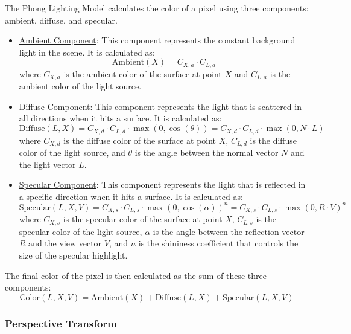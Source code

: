 The Phong Lighting Model calculates the color of a pixel using three components: ambient, diffuse, and specular.
\begin{itemize}
    \item \ul{Ambient Component}: This component represents the constant background light in the scene. It is calculated as:
    \begin{equation*}
        \text{Ambient}(X) = C_{X,a}\cdot C_{L,a}
    \end{equation*}
    where $C_{X,a}$ is the ambient color of the surface at point $X$ and $C_{L,a}$ is the ambient color of the light source.
    \item \ul{Diffuse Component}: This component represents the light that is scattered in all directions when it hits a surface. It is calculated as:
    \begin{equation*}
        \text{Diffuse}(L,X) = C_{X,d}\cdot C_{L,d} \cdot \max(0, \cos(\theta))= C_{X,d}\cdot C_{L,d} \cdot \max(0, N \cdot L)
    \end{equation*}
    where $C_{X,d}$ is the diffuse color of the surface at point $X$, $C_{L,d}$ is the diffuse color of the light source, and $\theta$ is the angle between the normal vector $N$ and the light vector $L$.
    \item \ul{Specular Component}: This component represents the light that is reflected in a specific direction when it hits a surface. It is calculated as:
    \begin{equation*}
        \text{Specular}(L,X,V) = C_{X,s}\cdot C_{L,s} \cdot \max(0, \cos(\alpha))^n = C_{X,s}\cdot C_{L,s} \cdot \max(0, R \cdot V)^n
    \end{equation*}
    where $C_{X,s}$ is the specular color of the surface at point $X$, $C_{L,s}$ is the specular color of the light source, $\alpha$ is the angle between the reflection vector $R$ and the view vector $V$, and $n$ is the shininess coefficient that controls the size of the specular highlight.
\end{itemize}
The final color of the pixel is then calculated as the sum of these three components:
\begin{equation*}
    \text{Color}(L,X,V) = \text{Ambient}(X) + \text{Diffuse}(L,X) + \text{Specular}(L,X,V)
\end{equation*}


\subsubsection{Perspective Transform}

